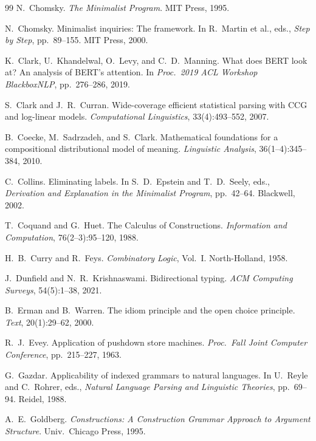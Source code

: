 \documentclass[12pt,a4paper]{article}
\begin{document}
\begin{thebibliography}{99}
N.~Chomsky.
\newblock \emph{The Minimalist Program}.
\newblock MIT Press, 1995.

N.~Chomsky.
\newblock Minimalist inquiries: The framework.
\newblock In R.~Martin et al., eds., \emph{Step by Step}, pp.~89--155. MIT Press, 2000.

K.~Clark, U.~Khandelwal, O.~Levy, and C.~D.~Manning.
\newblock What does BERT look at? An analysis of BERT's attention.
\newblock In \emph{Proc.\ 2019 ACL Workshop BlackboxNLP}, pp.~276--286, 2019.

S.~Clark and J.~R.~Curran.
\newblock Wide-coverage efficient statistical parsing with CCG and log-linear models.
\newblock \emph{Computational Linguistics}, 33(4):493--552, 2007.

B.~Coecke, M.~Sadrzadeh, and S.~Clark.
\newblock Mathematical foundations for a compositional distributional model of meaning.
\newblock \emph{Linguistic Analysis}, 36(1--4):345--384, 2010.

C.~Collins.
\newblock Eliminating labels.
\newblock In S.~D.~Epstein and T.~D.~Seely, eds., \emph{Derivation and Explanation in the Minimalist Program}, pp.~42--64. Blackwell, 2002.

T.~Coquand and G.~Huet.
\newblock The Calculus of Constructions.
\newblock \emph{Information and Computation}, 76(2--3):95--120, 1988.

H.~B.~Curry and R.~Feys.
\newblock \emph{Combinatory Logic}, Vol.~I.
\newblock North-Holland, 1958.

J.~Dunfield and N.~R.~Krishnaswami.
\newblock Bidirectional typing.
\newblock \emph{ACM Computing Surveys}, 54(5):1--38, 2021.

B.~Erman and B.~Warren.
\newblock The idiom principle and the open choice principle.
\newblock \emph{Text}, 20(1):29--62, 2000.

R.~J.~Evey.
\newblock Application of pushdown store machines.
\newblock \emph{Proc.\ Fall Joint Computer Conference}, pp.~215--227, 1963.

G.~Gazdar.
\newblock Applicability of indexed grammars to natural languages.
\newblock In U.~Reyle and C.~Rohrer, eds., \emph{Natural Language Parsing and Linguistic Theories}, pp.~69--94. Reidel, 1988.

A.~E.~Goldberg.
\newblock \emph{Constructions: A Construction Grammar Approach to Argument Structure}.
\newblock Univ.\ Chicago Press, 1995.


\end{thebibliography}
\end{document}
